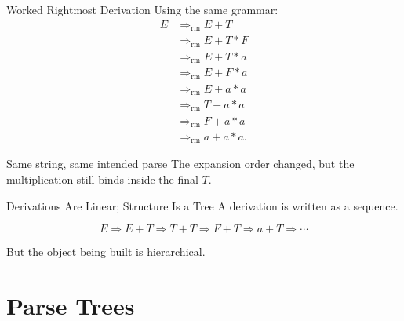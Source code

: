 \documentclass[aspectratio=169,10pt]{beamer}
\newcommand{\der}{\Rightarrow}
\newcommand{\rmder}{\Rightarrow_{\mathrm{rm}}}
\begin{document}
\begin{frame}{Worked Rightmost Derivation}
\small
Using the same grammar:
\begin{align*}
E
&\rmder E+T\\
&\rmder E+T*F\\
&\rmder E+T*a\\
&\rmder E+F*a\\
&\rmder E+a*a\\
&\rmder T+a*a\\
&\rmder F+a*a\\
&\rmder a+a*a.
\end{align*}

\begin{exampleblock}{Same string, same intended parse}
The expansion order changed, but the multiplication still binds inside the final \(T\).
\end{exampleblock}
\end{frame}

\begin{frame}{Derivations Are Linear; Structure Is a Tree}
\small
A derivation is written as a sequence.

\[
E\der E+T\der T+T\der F+T\der a+T\der\cdots
\]

But the object being built is hierarchical.

\begin{center}
\end{center}
\end{frame}

\section{Parse Trees}
\end{document}
